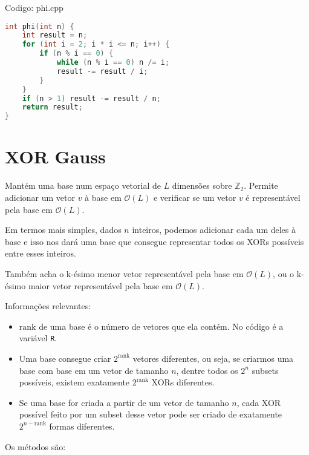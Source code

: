 \documentclass[10pt, a4paper, oneside]{book}
\begin{document}
Codigo: phi.cpp

\begin{lstlisting}[language=C++]
int phi(int n) {
    int result = n;
    for (int i = 2; i * i <= n; i++) {
        if (n % i == 0) {
            while (n % i == 0) n /= i;
            result -= result / i;
        }
    }
    if (n > 1) result -= result / n;
    return result;
}
\end{lstlisting}
\hfill

\section{XOR Gauss}


Mantém uma base num espaço vetorial de $L$ dimensões sobre $\mathbb{Z}_2$. Permite adicionar um vetor $v$ à base em $\mathcal{O}(L)$ e verificar se um vetor $v$ é representável pela base em $\mathcal{O}(L)$.



Em termos mais simples, dados $n$ inteiros, podemos adicionar cada um deles à base e isso nos dará uma base que consegue representar todos os XORs possíveis entre esses inteiros.



Também acha o k-ésimo menor vetor representável pela base em $\mathcal{O}(L)$, ou o k-ésimo maior vetor representável pela base em $\mathcal{O}(L)$.



Informações relevantes:



\begin{itemize}
\item $\text{rank}$ de uma base é o número de vetores que ela contém. No código é a variável \texttt{R}.
\item Uma base consegue criar $2^{\text{rank}}$ vetores diferentes, ou seja, se criarmos uma base com base em um vetor de tamanho $n$, dentre todos os $2^n$ subsets possíveis, existem exatamente $2^{\text{rank}}$ XORs diferentes.
\item Se uma base for criada a partir de um vetor de tamanho $n$, cada XOR possível feito por um subset desse vetor pode ser criado de exatamente $2^{n - \text{rank}}$ formas diferentes.
\end{itemize}



Os métodos são:
\end{document}
